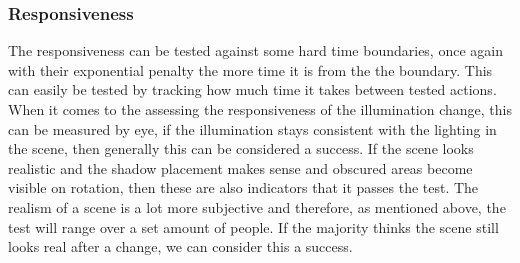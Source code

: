 \documentclass[11pt]{report}
\begin{document}
\subsubsection*{Responsiveness}
The responsiveness can be tested against some hard time boundaries, once again
with their exponential penalty the more time it is from the the boundary. This
can easily be tested by tracking how much time it takes between tested actions.
When it comes to the assessing the responsiveness of the illumination change,
this can be measured by eye, if the illumination stays consistent with the 
lighting in the scene, then generally this can be considered a success. If the
scene looks realistic and the shadow placement makes sense and obscured 
areas become visible on rotation, then these are also indicators that it passes
the test. The realism of a scene is a lot more subjective and therefore, as 
mentioned above, the test will range over a set amount of people. If the majority
thinks the scene still looks real after a change, we can consider this a success.




\end{document}
